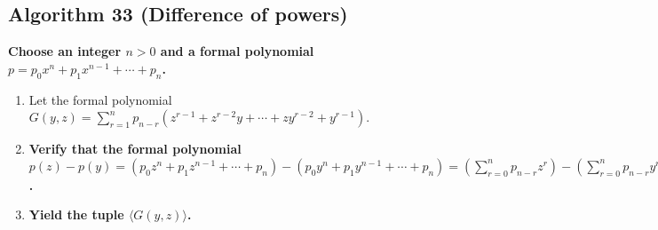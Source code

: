 \documentclass[twocolumn]{article}
\begin{document}
		\subsection{Algorithm 33 (Difference of powers)}\label{sec:algorithm 33}
			\textbf{Choose an integer $n>0$ and a formal polynomial $p=p_0x^n+p_1x^{n-1}+\cdots+p_n$.}
			\begin{enumerate}
				\item Let the formal polynomial $G(y,z)=\sum_{r=1}^n p_{n-r}(z^{r-1}+z^{r-2}y+\cdots+zy^{r-2}+y^{r-1})$.
				\item \textbf{Verify that the formal polynomial $p(z)-p(y)=(p_0z^n+p_1z^{n-1}+\cdots+p_n)-(p_0y^n+p_1y^{n-1}+\cdots+p_n)=(\sum_{r=0}^n p_{n-r}z^r)-(\sum_{r=0}^n p_{n-r}y^r)=\sum_{r=1}^n p_{n-r}(z^r-y^r)=\sum_{r=1}^n p_{n-r}(z-y)(z^{r-1}+z^{r-2}y+\cdots+zy^{r-2}+y^{r-1})=(z-y)\sum_{r=1}^n p_{n-r}(z^{r-1}+z^{r-2}y+\cdots+zy^{r-2}+y^{r-1})=(z-y)G(y,z)$.}
				\item \textbf{Yield the tuple $\langle G(y,z)\rangle$.}
			\end{enumerate}
\end{document}
